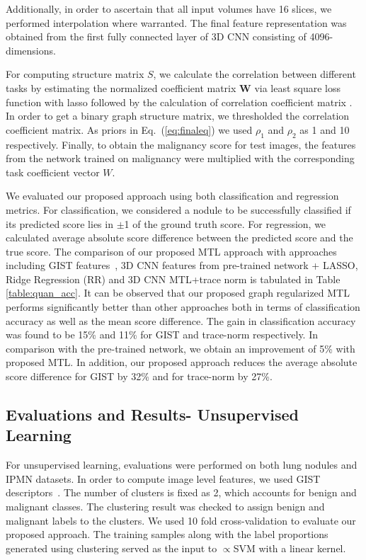 \documentclass[journal]{IEEEtran}
\begin{document}
Additionally, in order to ascertain that all input volumes have 16 slices, we performed interpolation where warranted. The final feature representation was obtained from the first fully connected layer of 3D CNN consisting of 4096-dimensions. 

For computing structure matrix $S$, we calculate the correlation between different tasks by estimating the normalized coefficient matrix $\mathbf{W}$ via least square loss function with lasso followed by the calculation of correlation coefficient matrix \cite{zhou2011malsar}. In order to get a binary graph structure matrix, we thresholded the correlation coefficient matrix. As priors in Eq.~(\ref{eq:finaleq}) we used $\rho_1$ and $\rho_2$ as 1 and 10 respectively. Finally, to obtain the malignancy score for test images, the features from the network trained on malignancy were multiplied with the corresponding task coefficient vector $W$.

We evaluated our proposed approach using both classification and regression metrics. For classification, we considered a nodule to be successfully classified if its predicted score lies in $\pm$1 of the ground truth score. For regression, we calculated average absolute score difference between the predicted score and the true score. The comparison of our proposed MTL approach with approaches including GIST features~\cite{GIST}, 3D CNN features from pre-trained network + LASSO, Ridge Regression (RR) and 3D CNN MTL+trace norm is tabulated in Table \ref{table:quan_acc}. It can be observed that our proposed graph regularized MTL performs significantly better than other approaches both in terms of classification accuracy as well as the mean score difference. The gain in classification accuracy was found to be 15\% and 11\% for GIST and trace-norm respectively. In comparison with the pre-trained network, we obtain an improvement of 5\% with proposed MTL. In addition, our proposed approach reduces the average absolute score difference for GIST by 32\% and for trace-norm by 27\%.

\subsection{Evaluations and Results- Unsupervised Learning}
For unsupervised learning, evaluations were performed on both lung nodules and IPMN datasets. In order to compute image level features, we used GIST descriptors~\cite{GIST}. The number of clusters is fixed as 2, which accounts for benign and malignant classes. The clustering result was checked to assign benign and malignant labels to the clusters. We used 10 fold cross-validation to evaluate our proposed approach. The training samples along with the label proportions generated using clustering served as the input to $\propto$SVM with a linear kernel.  
\end{document}
